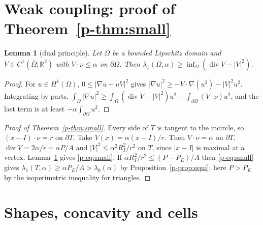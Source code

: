 \documentclass[11pt]{article}
\newtheorem{lemma}[theorem]{Lemma}
\theoremstyle{remark}
\newcommand{\R}{\mathbb{R}}
\begin{document}
\section{Weak coupling: proof of Theorem~\ref{p-thm:small}}\label{p-sec:small}

\begin{lemma}[dual principle]\label{p-lem:dual}
Let $\Omega$ be a bounded Lipschitz domain and $V\in C^1(\overline\Omega;\R^2)$ with
$V\cdot\nu\le\alpha$ on $\partial\Omega$. Then
$\lambda_1(\Omega,\alpha)\ge\inf_\Omega(\operatorname{div}V-|V|^2)$.
\end{lemma}

\begin{proof}
For $u\in H^1(\Omega)$, $0\le|\nabla u+uV|^2$ gives
$|\nabla u|^2\ge-V\cdot\nabla(u^2)-|V|^2u^2$. Integrating by parts,
$\int_\Omega|\nabla u|^2\ge\int_\Omega(\operatorname{div}V-|V|^2)u^2
-\int_{\partial\Omega}(V\cdot\nu)u^2$, and the last term is at least
$-\alpha\int_{\partial\Omega}u^2$.
\end{proof}

\begin{proof}[Proof of Theorem~\ref{p-thm:small}]
Every side of $T$ is tangent to the incircle, so $(x-I)\cdot\nu=r$ on $\partial T$. Take
$V(x)=\alpha(x-I)/r$. Then $V\cdot\nu=\alpha$ on $\partial T$,
$\operatorname{div}V=2\alpha/r=\alpha P/A$ and $|V|^2\le\alpha^2R_I^2/r^2$ on $T$, since $|x-I|$
is maximal at a vertex. Lemma~\ref{p-lem:dual} gives \eqref{p-eq:small}. If
$\alpha R_I^2/r^2\le(P-P_E)/A$ then \eqref{p-eq:small} gives
$\lambda_1(T,\alpha)\ge\alpha P_E/A>\lambda_0(\alpha)$ by Proposition~\ref{p-prop:equi}; here
$P>P_E$ by the isoperimetric inequality for triangles.
\end{proof}

\section{Shapes, concavity and cells}\label{p-sec:shapes}
\end{document}

